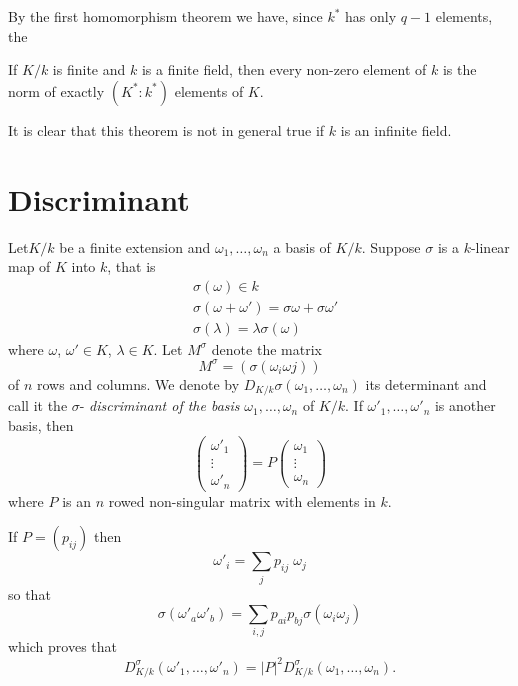 By the first homomorphism theorem we have, since $k^*$ has only $ q-1 $
elements, the  


\begin{thm}\label{c4:thm3}%
 If $ K/k $ is finite and $k$ is a finite field, then every
  non-zero element of $k$ is the norm of exactly $ ( K^* : k^* ) $
  elements of $K$.  
\end{thm}

It is clear that this theorem is not in general true if $k$ is an
infinite field. 


\section{Discriminant}\label{c4:s2}%

Let\pageoriginale $K/ k$ be a finite extension and $\omega_1, \ldots ,
\omega_n$ a basis of $K/k$. Suppose  $\sigma$ is a $k$-linear map of $K$
into $k$, that is   
\begin{align*}
 & \sigma (\omega ) \in k\\
 & \sigma (\omega +  \omega ')  = \sigma \omega + \sigma \omega ' \\
 & \sigma (\lambda) = \lambda \sigma (\omega) 
\end{align*}
where $\omega$, $\omega ' \in K$, $\lambda \in K$. Let $M^\sigma$ denote
the matrix  
$$
M^\sigma = (\sigma (\omega_i \omega j)) 
$$
of $n$ rows and columns. We denote by $D_{K/k}\sigma (\omega_1 ,
\ldots , \omega _n)$ its determinant and call it the $\sigma$-
\textit{discriminant of the basis} $\omega _1, \ldots , \omega _n $ 
of $K/k$. If $\omega'_1, \ldots , \omega'_n$ is another basis, then   
$$
\begin{pmatrix}
\omega'_1 \\
\vdots \\
\omega'_n 
\end{pmatrix}
= P 
\begin{pmatrix}
\omega_1 \\
\vdots \\
\omega_n 
\end{pmatrix}
$$
where $P$ is an $n$ rowed non-singular matrix with elements in $k$. 

If $P = (p_{ij})$ then 
$$
\omega' _i = \sum_j p_{ij} \; \omega_j 
$$
so that 
$$
\sigma (\omega'_a \omega'_b) = \sum_{ i , j} p_{ ai }p_{bj} \sigma
(\omega _i \omega_j ) 
$$
which proves that 
$$
D^\sigma_{K/k} (\omega' _1 , \ldots , \omega'_ n ) = |P| ^2 D^\sigma
_{K / k} ( \omega _1, \ldots , \omega_n )  .
$$

